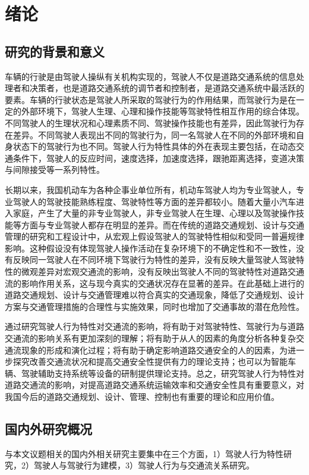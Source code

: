 \chapter{绪论}
\section{研究的背景和意义}

车辆的行驶是由驾驶人操纵有关机构实现的，驾驶人不仅是道路交通系统的信息处理者和决策者，也是道路交通系统的调节者和控制者，是道路交通系统中最活跃的要素。车辆的行驶状态是驾驶人所采取的驾驶行为的作用结果，而驾驶行为是在一定的外部环境下，驾驶人生理、心理和操作技能等驾驶特性相互作用的综合体现。不同驾驶人的生理状况和心理素质不同、驾驶操作技能也有差异，因此驾驶行为存在差异。不同驾驶人表现出不同的驾驶行为，同一名驾驶人在不同的外部环境和自身状态下的驾驶行为也不同。驾驶人行为特性具体的外在表现主要包括，在动态交通条件下，驾驶人的反应时间，速度选择，加速度选择，跟驰距离选择，变道决策与间隙接受等一系列特性。

长期以来，我国机动车为各种企事业单位所有，机动车驾驶人均为专业驾驶人，专业驾驶人的驾驶技能熟练程度、驾驶特性等方面的差异都较小。随着大量小汽车进入家庭，产生了大量的非专业驾驶人，非专业驾驶人在生理、心理以及驾驶操作技能等方面与专业驾驶人都存在明显的差异。而在传统的道路交通规划、设计与交通管理的研究和工程设计中，从宏观上假设驾驶人的驾驶特性相似和受同一普遍规律影响。这种假设没有体现驾驶人操作活动在复杂环境下的不确定性和不一致性，没有反映同一驾驶人在不同环境下驾驶行为特性的差异，没有反映大量驾驶人驾驶特性的微观差异对宏观交通流的影响，没有反映出驾驶人不同的驾驶特性对道路交通流的影响作用关系，这与现今真实的交通状况存在显著的差异。在此基础上进行的道路交通规划、设计与交通管理难以符合真实的交通现象，降低了交通规划、设计方案与交通管理措施的合理性与实施效果，同时也增加了交通事故的潜在危险性。

通过研究驾驶人行为特性对交通流的影响，将有助于对驾驶特性、驾驶行为与道路交通流的影响关系有更加深刻的理解；将有助于从人的因素的角度分析各种复杂交通流现象的形成和演化过程；将有助于确定影响道路交通安全的人的因素，为进一步探究改善交通流状况和提高交通安全性提供有力的理论支持；也可以为智能车辆、驾驶辅助支持系统等设备的研制提供理论支持。总之，研究驾驶人行为特性对道路交通流的影响，对提高道路交通系统运输效率和交通安全性具有重要意义，对我国今后的道路交通规划、设计、管理、控制也有重要的理论和应用价值。



\section{国内外研究概况}
与本文议题相关的国内外相关研究主要集中在三个方面，1）驾驶人行为特性研究，2）驾驶人与驾驶行为建模，3）驾驶人行为与交通流关系研究。

